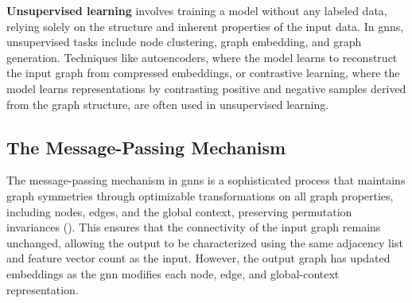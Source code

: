 \textbf{Unsupervised learning} involves training a model without any labeled data, relying solely on the structure and inherent properties of the input data.
In \glspl{gnn}, unsupervised tasks include node clustering, graph embedding, and graph generation.
Techniques like autoencoders, where the model learns to reconstruct the input graph from compressed embeddings, or contrastive learning, where the model learns representations by contrasting positive and negative samples derived from the graph structure, are often used in unsupervised learning.

\subsection*{The Message-Passing Mechanism}
The message-passing mechanism in \glspl{gnn} is a sophisticated process that maintains graph symmetries through optimizable transformations on all graph properties, including nodes, edges, and the global context, preserving permutation invariances (\cite{Khemani2024}).
This ensures that the connectivity of the input graph remains unchanged, allowing the output to be characterized using the same adjacency list and feature vector count as the input.
However, the output graph has updated embeddings as the \gls{gnn} modifies each node, edge, and global-context representation.

